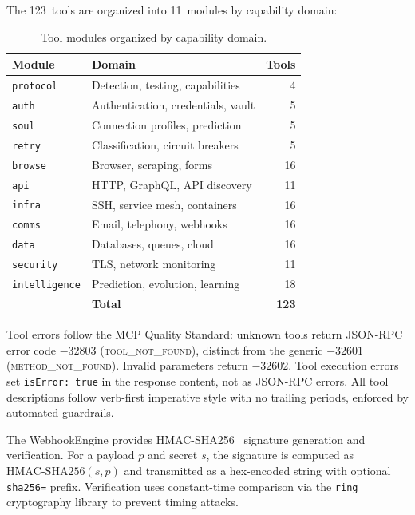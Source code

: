\documentclass[10pt, twocolumn]{article}
\begin{document}
The 123~tools are organized into 11~modules by capability domain:

\begin{table}[h]
\caption{Tool modules organized by capability domain.}
\label{tab:tools}
\centering
\scriptsize
\begin{tabular}{@{}llr@{}}
\toprule
\textbf{Module} & \textbf{Domain} & \textbf{Tools} \\
\midrule
\texttt{protocol} & Detection, testing, capabilities & 4 \\
\texttt{auth} & Authentication, credentials, vault & 5 \\
\texttt{soul} & Connection profiles, prediction & 5 \\
\texttt{retry} & Classification, circuit breakers & 5 \\
\texttt{browse} & Browser, scraping, forms & 16 \\
\texttt{api} & HTTP, GraphQL, API discovery & 11 \\
\texttt{infra} & SSH, service mesh, containers & 16 \\
\texttt{comms} & Email, telephony, webhooks & 16 \\
\texttt{data} & Databases, queues, cloud & 16 \\
\texttt{security} & TLS, network monitoring & 11 \\
\texttt{intelligence} & Prediction, evolution, learning & 18 \\
\midrule
& \textbf{Total} & \textbf{123} \\
\bottomrule
\end{tabular}
\end{table}

Tool errors follow the MCP Quality Standard: unknown tools return JSON-RPC error code $-32803$ (\textsc{tool\_not\_found}), distinct from the generic $-32601$ (\textsc{method\_not\_found}). Invalid parameters return $-32602$. Tool execution errors set \texttt{isError: true} in the response content, not as JSON-RPC errors. All tool descriptions follow verb-first imperative style with no trailing periods, enforced by automated guardrails.

The WebhookEngine provides HMAC-SHA256~\cite{rfc2104} signature generation and verification. For a payload $p$ and secret $s$, the signature is computed as $\text{HMAC-SHA256}(s, p)$ and transmitted as a hex-encoded string with optional \texttt{sha256=} prefix. Verification uses constant-time comparison via the \texttt{ring}~\cite{ring2024} cryptography library to prevent timing attacks.
\end{document}
